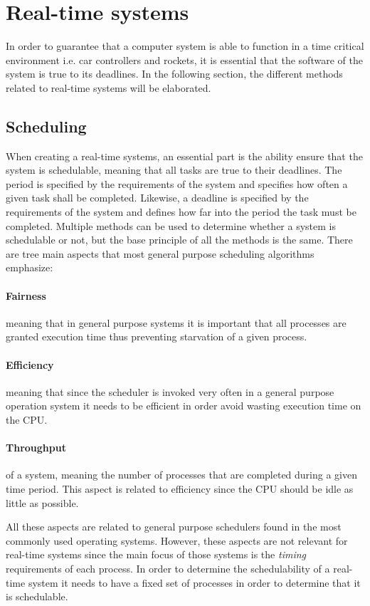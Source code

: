\section{Real-time systems}\label{Theory:RTS}
In order to guarantee that a computer system is able to function in a time critical environment i.e. car controllers and rockets, it is essential that the software of the system is true to its deadlines. 
In the following section, the different methods related to real-time systems will be elaborated.

\subsection{Scheduling}
When creating a real-time systems, an essential part is the ability ensure that the system is schedulable, meaning that all tasks are true to their deadlines. 
The period is specified by the requirements of the system and specifies how often a given task shall be completed.
Likewise, a deadline is specified by the requirements of the system and defines how far into the period the task must be completed.
Multiple methods can be used to determine whether a system is schedulable or not, but the base principle of all the methods is the same. 
There are tree main aspects that most general purpose scheduling algorithms emphasize:
\paragraph{Fairness} meaning that in general purpose systems it is important that all processes are granted execution time thus preventing starvation of a given process. 
\paragraph{Efficiency} meaning that since the scheduler is invoked very often in a general purpose operation system it needs to be efficient in order avoid wasting execution time on the CPU. 
\paragraph{Throughput} of a system, meaning the number of processes that are completed during a given time period.
This aspect is related to efficiency since the CPU should be idle as little as possible. 

All these aspects are related to general purpose schedulers found in the most commonly used operating systems. 
However, these aspects are not relevant for real-time systems since the main focus of those systems is the \textit{timing} requirements of each process.
In order to determine the schedulability of a real-time system it needs to have a fixed set of processes in order to determine that it is schedulable.

